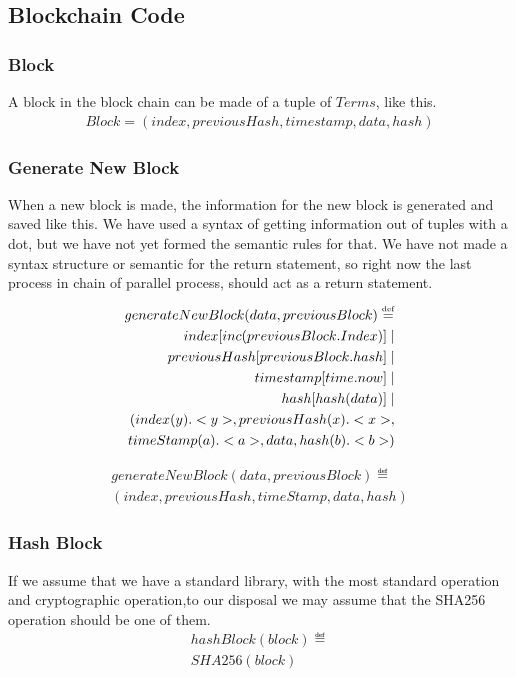 \subsection{Blockchain Code}

\subsubsection{Block}
A block in the block chain can be made of a tuple of $Terms$, like this.
\begin{align*}
    Block = (index, previousHash, timestamp, data, hash)
\end{align*}

\subsubsection{Generate New Block}
When a new block is made, the information for the new block is generated and saved like this. We have used a syntax of getting information out of tuples with a dot, but we have not yet formed the semantic rules for that. We have not made a syntax structure or semantic for the return statement, so right now the last process in chain of parallel process, should act as a return statement.
\begin{align*}
    generateNewBlock(data, previousBlock)\overset{\underset{\mathrm{def}}{}}{=} \\
    index[inc(previousBlock.Index)]\mid\\
    previousHash[previousBlock.hash] \mid \\
    timestamp[time.now] \mid \\
    hash[hash(data)] \mid \\
    (index(y).<y>, previousHash(x).<x>,\\ timeStamp(a).<a>, data, hash(b).<b>)
\end{align*}

\begin{align*}
generateNewBlock(data, previousBlock)\eqdef \\(index, previousHash, timeStamp, data, hash)
\end{align*}


\subsubsection{Hash Block}
If we assume that we have a standard library, with the most standard operation and cryptographic operation,to our disposal we may assume that the SHA256 operation should be one of them.
\begin{align*}
    hashBlock(block)\eqdef\\
    SHA256(block)\\
\end{align*}

